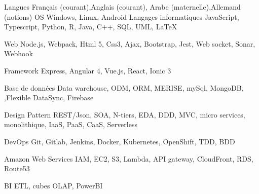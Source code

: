 

\begin{cvskills}
  \cvskill
    {Langues } %
    {Français  (courant),Anglais (courant), Arabe (maternelle),Allemand (notions)} %
  \cvskill
    {OS} %
    {Windows, Linux, Android} %
  \cvskill
    {Langages informatiques} %
    {JavaScript, Typescript, Python, R, Java, C++, SQL, UML, LaTeX} %

  \cvskill
    {Web} %
    {Node.js, Webpack, Html 5, Css3, Ajax, Bootstrap, Jest, Web socket, Sonar, Webhook} %

  \cvskill
    {Framework} %
    {Express, Angular 4, Vue.js, React, Ionic 3} %

  \cvskill
    {Base de données} %
    {Data warehouse, ODM, ORM, MERISE, mySql, MongoDB, ,Flexible DataSync, Firebase } %

  \cvskill
    {Design Pattern} %
    {REST/Json, SOA, N-tiers, EDA, DDD, MVC, micro services, monolithique, IaaS, PaaS, CaaS, Serverless } %

  \cvskill
    {DevOps} %
    {Git, Gitlab, Jenkins, Docker, Kubernetes, OpenShift, TDD, BDD  } %

\cvskill
    {Amazon Web Services} %
    {IAM, EC2, S3, Lambda, API gateway, CloudFront, RDS, Route53 } %

\cvskill
    {BI} %
    {ETL, cubes OLAP, PowerBI } %



\end{cvskills}
